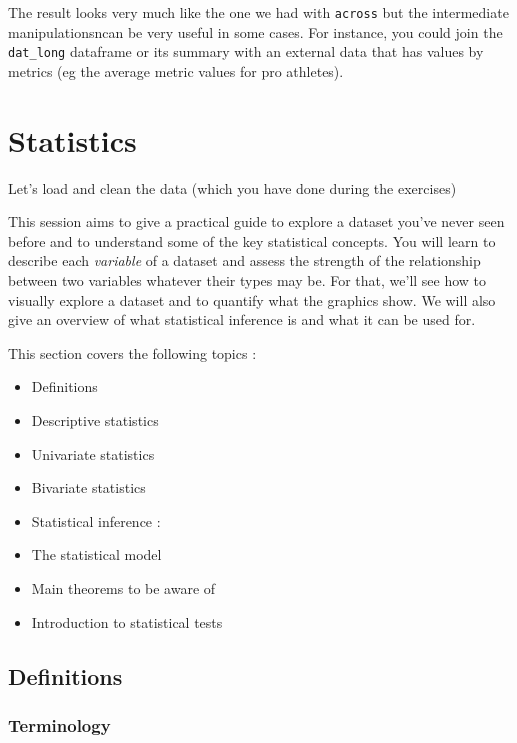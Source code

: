 \documentclass[
]{book}
\begin{document}
The result looks very much like the one we had with \texttt{across} but the intermediate manipulationsncan be very useful in some cases. For instance, you could join the \texttt{dat\_long} dataframe or its summary with an external data that has values by metrics (eg the average metric values for pro athletes).

\hypertarget{stats}{%
\chapter{Statistics}\label{stats}}

Let's load and clean the data (which you have done during the exercises)

This session aims to give a practical guide to explore a dataset you've never seen before and to understand some of the key statistical concepts. You will learn to describe each \emph{variable} of a dataset and assess the strength of the relationship between two variables whatever their types may be. For that, we'll see how to visually explore a dataset and to quantify what the graphics show. We will also give an overview of what statistical inference is and what it can be used for.

This section covers the following topics :

\begin{itemize}
\item
  Definitions
\item
  Descriptive statistics
\item
  Univariate statistics
\item
  Bivariate statistics
\item
  Statistical inference :
\item
  The statistical model
\item
  Main theorems to be aware of
\item
  Introduction to statistical tests
\end{itemize}

\hypertarget{definitions}{%
\section{Definitions}\label{definitions}}

\hypertarget{terminology}{%
\subsection{Terminology}\label{terminology}}
\end{document}
